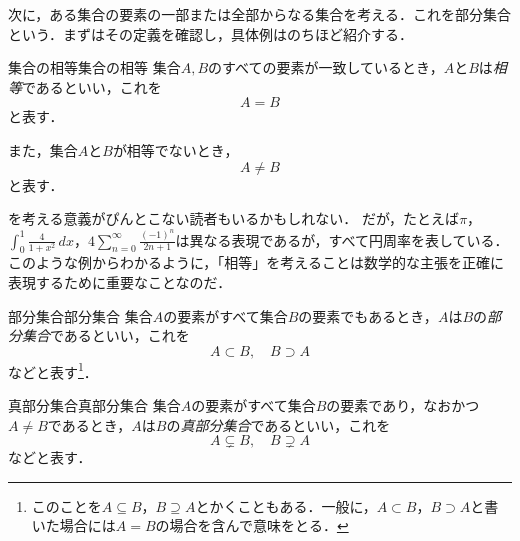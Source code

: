次に，ある集合の要素の一部または全部からなる集合を考える．これを部分集合という．まずはその定義を確認し，具体例はのちほど紹介する．

\begin{definition}{集合の相等}{集合の相等}
  集合$A,B$のすべての要素が一致しているとき，$A$と$B$は\emph{相等}であるといい，これを
  \[
    A = B
  \]
  と表す．

  また，集合$A$と$B$が相等でないとき，
  \[
    A \ne B
  \]
  と表す．
\end{definition}

\begin{remark}[相等を考える意義]
  を考える意義がぴんとこない読者もいるかもしれない．
  だが，たとえば$\pi$，$\int_{0}^{1} \frac{4}{1+x^2} \, dx$，$4 \sum_{n=0}^{\infty} \frac{(-1)^n}{2n+1}$は異なる表現であるが，すべて円周率を表している．
  このような例からわかるように，「相等」を考えることは数学的な主張を正確に表現するために重要なことなのだ．
\end{remark}

\begin{definition}[
    sidebyside,
    righthand width=\mnsc{4.2cm},
    sidebyside gap=\mnsc{4mm},
  ]{部分集合}{部分集合}
  集合$A$の要素がすべて集合$B$の要素でもあるとき，$A$は$B$の\emph{部分集合}であるといい，これを
  \[
    A \subset B,\quad B \supset A
  \]
  などと表す\footnote{このことを$ A \subseteq B$，$B \supseteq A$とかくこともある．一般に，$A \subset B$，$ B \supset A$と書いた場合には$A=B$の場合を含んで意味をとる．}．

  \tcblower

  \centering
\end{definition}

\begin{definition}{真部分集合}{真部分集合}
  集合$A$の要素がすべて集合$B$の要素であり，なおかつ$A \ne B$であるとき，$A$は$B$の\emph{真部分集合}であるといい，これを
  \[
    A \subsetneq B,\quad B \supsetneq A
  \]
  などと表す．
\end{definition}

